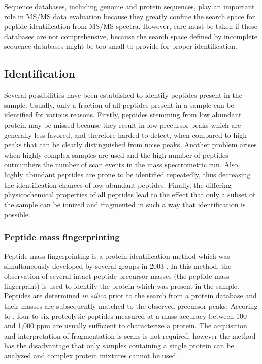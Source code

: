 Sequence databases, including genome and protein sequences, play an important
role in MS/MS data evaluation because they greatly confine the search space
for peptide identification from MS/MS spectra.
However, care must be taken if these databases are not comprehensive, because
the search space defined by incomplete sequence databases might be too small
to provide for proper identification.


\subsection{Identification}

Several possibilities have been established to identify peptides present
in the sample. 
Usually, only a fraction of all peptides present in a sample can be 
identified for various reasons.
Firstly, peptides stemming from low abundant protein may be missed because 
they result in low precursor peaks which are generally less favored, and
therefore harded to detect, when compared to high peaks that can be clearly
distinguished from noise peaks.
Another problem arises when highly complex samples are used and the
high number of peptides outnumbers the number of scan events in the
mass spectrometric run.
Also, highly abundant peptides are prone to be identified repeatedly,
thus decreasing the identification chances of low abundant peptides.
Finally, the differing physicochemical properties of all peptides
lead to the effect that only a subset of the sample can be ionized and
fragmented in such a way that identification is possible.

\subsubsection{Peptide mass fingerprinting}

Peptide mass fingerprinting is a protein identification method which was
simultaneously developed by several groups in 2003 
\citep{Henzel1993,James1993,Mann1993,Pappin1993a,Yates1993}.
In this method, the observation of several intact peptide precursor masses
(the peptide mass fingerprint) is used to identify the protein which was 
present in the sample.
Peptides are determined {\em in silico} prior to the search from a protein
database and their masses are subsequently matched to the observed precursor
peaks.
Accoring to \citet{Mann1993}, four to six proteolytic peptides measured
at a mass accuracy between 100 and 1,000 ppm are usually sufficient to
characterize a protein.
The acquisition and interpretation of fragmentation is scans is not required, 
however the method has the disadvantage that only samples containing a single 
protein can be analyzed and complex protein mixtures cannot be used.

